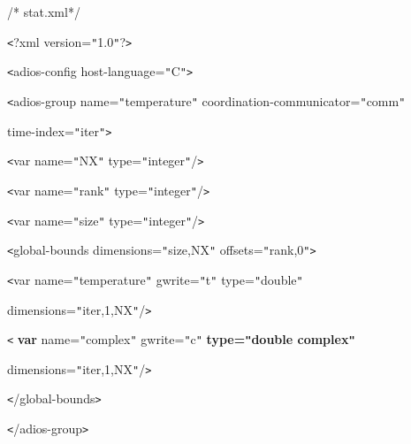 \vspace{23pt}
/* stat.xml*/

\vspace{23pt}
\texttt{<}?xml version=\texttt{"}1.0\texttt{"}?\texttt{>}

\vspace{10pt}
\texttt{<}adios-config host-language=\texttt{"}C\texttt{"}\texttt{>}

\vspace{10pt}
\texttt{<}adios-group name=\texttt{"}temperature\texttt{"} coordination-communicator=\texttt{"}comm\texttt{"} 

\vspace{10pt}
\leftskip=36pt
\parindent=36pt
time-index=\texttt{"}iter\texttt{"}\texttt{>}

\vspace{10pt}
\leftskip=0pt
\parindent=0pt
\texttt{<}var name=\texttt{"}NX\texttt{"} type=\texttt{"}integer\texttt{"}/\texttt{>}

\vspace{10pt}
\texttt{<}var name=\texttt{"}rank\texttt{"} type=\texttt{"}integer\texttt{"}/\texttt{>}

\vspace{10pt}
\texttt{<}var name=\texttt{"}size\texttt{"} type=\texttt{"}integer\texttt{"}/\texttt{>}

\vspace{10pt}
\texttt{<}global-bounds dimensions=\texttt{"}size,NX\texttt{"} offsets=\texttt{"}rank,0\texttt{"}\texttt{>}

\vspace{10pt}
\texttt{<}var name=\texttt{"}temperature\texttt{"} gwrite=\texttt{"}t\texttt{"} 
type=\texttt{"}double\texttt{"}

\vspace{10pt}
dimensions=\texttt{"}iter,1,NX\texttt{"}/\texttt{>}

\vspace{10pt}
\parindent=36pt
{\color{color02} \texttt{<}}{\color{color02} \textbf{var}}{\color{color02}  name=\texttt{"}complex\texttt{"} 
gwrite=\texttt{"}c\texttt{"} }{\color{color02} \textbf{type=\texttt{"}double complex\texttt{"}}}

\vspace{10pt}
\parindent=0pt
{\color{color02} dimensions=\texttt{"}iter,1,NX\texttt{"}/\texttt{>}}

\vspace{10pt}
\texttt{<}/global-bounds\texttt{>}

\vspace{10pt}
\parindent=36pt
\texttt{<}/adios-group\texttt{>}

